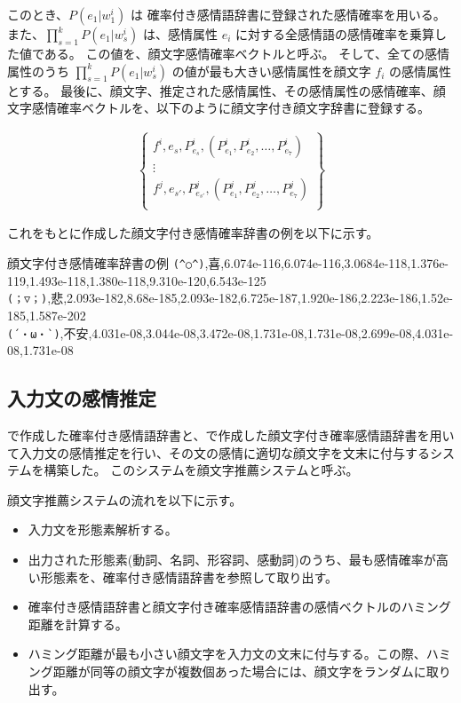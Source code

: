 \documentclass[11pt,a4j]{jsarticle}
\begin{document}
このとき、$P(e_1|w^i_1)$ は 確率付き感情語辞書に登録された感情確率を用いる。
また、$\prod_{s=1}^{k}P(e_1|w^i_s)$ は、感情属性 $e_i$ に対する全感情語の感情確率を乗算した値である。
この値を、顔文字感情確率ベクトルと呼ぶ。
そして、全ての感情属性のうち $\prod_{s=1}^{k}P(e_1|w^i_s)$ の値が最も大きい感情属性を顔文字 $f_i$ の感情属性とする。
最後に、顔文字、推定された感情属性、その感情属性の感情確率、顔文字感情確率ベクトルを、以下のように顔文字付き顔文字辞書に登録する。

\begin{eqnarray*}
  \left\{
   \begin{array}{c}
     f^i, e_s, P^i_{e_s}, (P^i_{e_1}, P^i_{e_2}, \ldots, P^i_{e_7})\\
     \vdots \\
     f^j, e_{s'}, P^j_{e_{s'}}, (P^j_{e_1}, P^j_{e_2}, \ldots, P^j_{e_7})\\
   \end{array}
  \right\}
\end{eqnarray*}


これをもとに作成した顔文字付き感情確率辞書の例を以下に示す。

\begin{itembox}[l]{顔文字付き感情確率辞書の例}
\verb|(^○^)|,喜,6.074e-116,6.074e-116,3.0684e-118,1.376e-119,1.493e-118,1.380e-118,9.310e-120,6.543e-125\\
\verb|(；▽；)|,悲,2.093e-182,8.68e-185,2.093e-182,6.725e-187,1.920e-186,2.223e-186,1.52e-185,1.587e-202\\
\verb|(´・ω・`)|,不安,4.031e-08,3.044e-08,3.472e-08,1.731e-08,1.731e-08,2.699e-08,4.031e-08,1.731e-08\\
\end{itembox}

\subsection{入力文の感情推定}
で作成した確率付き感情語辞書と、で作成した顔文字付き確率感情語辞書を用いて入力文の感情推定を行い、その文の感情に適切な顔文字を文末に付与するシステムを構築した。
このシステムを顔文字推薦システムと呼ぶ。

顔文字推薦システムの流れを以下に示す。

\begin{itemize}
  \item
    入力文を形態素解析する。
  \item
    出力された形態素(動詞、名詞、形容詞、感動詞)のうち、最も感情確率が高い形態素を、確率付き感情語辞書を参照して取り出す。
  \item
    確率付き感情語辞書と顔文字付き確率感情語辞書の感情ベクトルのハミング距離を計算する。
  \item
    ハミング距離が最も小さい顔文字を入力文の文末に付与する。この際、ハミング距離が同等の顔文字が複数個あった場合には、顔文字をランダムに取り出す。
\end{itemize}
\end{document}
